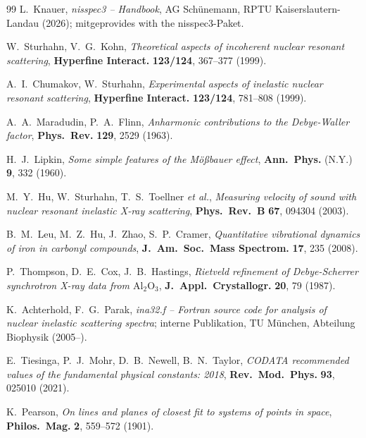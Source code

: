 \documentclass[11pt,a4paper,twoside]{article}
\theoremstyle{remark}
\begin{document}
\begin{thebibliography}{99}
L.~Knauer,
\emph{nisspec3 -- Handbook},
AG Sch\"unemann, RPTU Kaiserslautern-Landau (2026);
mitgeprovides with the nisspec3-Paket.

W.~Sturhahn, V.~G.~Kohn,
\emph{Theoretical aspects of incoherent nuclear resonant scattering},
\textbf{Hyperfine Interact.} \textbf{123/124}, 367--377 (1999).

A.~I.~Chumakov, W.~Sturhahn,
\emph{Experimental aspects of inelastic nuclear resonant scattering},
\textbf{Hyperfine Interact.} \textbf{123/124}, 781--808 (1999).

A.~A.~Maradudin, P.~A.~Flinn,
\emph{Anharmonic contributions to the Debye-Waller factor},
\textbf{Phys.\ Rev.} \textbf{129}, 2529 (1963).

H.~J.~Lipkin,
\emph{Some simple features of the M\"o\ss bauer effect},
\textbf{Ann.\ Phys.} (N.Y.) \textbf{9}, 332 (1960).

M.~Y.~Hu, W.~Sturhahn, T.~S.~Toellner \emph{et al.},
\emph{Measuring velocity of sound with nuclear resonant inelastic
X-ray scattering},
\textbf{Phys.\ Rev.\ B} \textbf{67}, 094304 (2003).

B.~M.~Leu, M.~Z.~Hu, J.~Zhao, S.~P.~Cramer,
\emph{Quantitative vibrational dynamics of iron in carbonyl compounds},
\textbf{J.\ Am.\ Soc.\ Mass Spectrom.} \textbf{17}, 235 (2008).

P.~Thompson, D.~E.~Cox, J.~B.~Hastings,
\emph{Rietveld refinement of Debye-Scherrer synchrotron X-ray data
from $\mathrm{Al}_2\mathrm{O}_3$},
\textbf{J.\ Appl.\ Crystallogr.} \textbf{20}, 79 (1987).

K.~Achterhold, F.~G.~Parak,
\emph{ina32.f -- Fortran source code for analysis of nuclear inelastic
scattering spectra}; interne Publikation, TU M\"unchen, Abteilung
Biophysik (2005--).

E.~Tiesinga, P.~J.~Mohr, D.~B.~Newell, B.~N.~Taylor,
\emph{CODATA recommended values of the fundamental physical constants:
2018},
\textbf{Rev.\ Mod.\ Phys.} \textbf{93}, 025010 (2021).


K.~Pearson,
\emph{On lines and planes of closest fit to systems of points in space},
\textbf{Philos.\ Mag.} \textbf{2}, 559--572 (1901).


\end{thebibliography}
\end{document}
